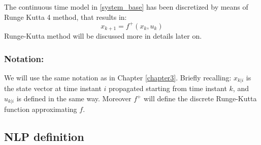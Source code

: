 The continuous time model in \ref{system_base} has been discretized by means of Runge Kutta 4 method, that results in:
\begin{equation} \label{system_base_d}
	{x}_{k+1}=f^+(x_k,u_k)
\end{equation}
Runge-Kutta method will be discussed more in details later on.

\subsubsection*{Notation:}
We will use the same notation as in Chapter \ref{chapter3}. Briefly recalling: ${x}_{k|i}$ is the state vector at time instant $i$ propagated starting from time instant $k$, and ${u}_{k|i}$ is defined in the same way. Moreover $f^+$ will define the discrete Runge-Kutta function approximating $f$.

\subsection{NLP definition}

